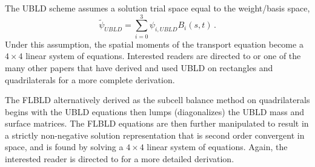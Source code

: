 \documentclass{mc2015}
\newcommand{\benum}{\begin{equation}} 			%
\newcommand{\eenum}{\end{equation}}
\newcommand{\beanum}{\begin{eqnarray}}  %
\newcommand{\eeanum}{\end{eqnarray}}
\newcommand{\eqts}[1]{Eqs. (\ref{#1})}  %
\newcommand{\B}[1]{\ensuremath{{B_{#1} }}}
\newcommand{\p}{\ensuremath{ \partial}}
\newcommand{\abs}[1]{\ensuremath{\left\lvert #1 \right\rvert}}
\newcommand{\omg}{\ensuremath{\vec{\Omega}}}
\newcommand{\pec}{\, ,}
\newcommand{\pep}{\, .}
\begin{document}

The UBLD scheme assumes a solution trial space equal to the weight/basis space,
\benum
\widetilde{\psi}_{UBLD} = \sum_{i=0}^3{\psi_{i,UBLD} \B{i}(s,t)  } \pep
\eenum
Under this assumption, the spatial moments of the transport equation become a $4\times 4$ linear system of equations.  
Interested readers are directed to \cite{adams_dfem} or one of the many other papers that have derived and used UBLD on rectangles and quadrilaterals for a more complete derivation.

The FLBLD \cite{flbld,adams_dfem} alternatively derived as the subcell balance method on quadrilaterals \cite{adams_scb} begins with the UBLD equations then lumps (diagonalizes) the UBLD mass and surface matrices.  The FLBLD equations are then further manipulated to result in a strictly non-negative solution representation that is second order convergent in space, and is found by solving a $4\times 4$ linear system of equations.  Again, the interested reader is directed to \cite{flbld,adams_dfem,adams_scb} for a more detailed derivation.
\end{document}

